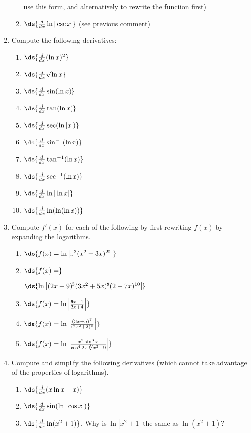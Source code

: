 \begin{multicols}{2}
\begin{enumerate}
\begin{enumerate}
                                         use this form, and alternatively to
                                         rewrite the function first)
   \item $\ds{\frac{d}{dx}\ln|\csc x|}$ (see previous comment)
   \end{enumerate}
\item Compute the following derivatives:
  \begin{enumerate}
  \item $\ds{\frac{d}{dx}(\ln x)^2}$
  \item $\ds{\frac{d}{dx}\sqrt{\ln x}}$
  \item $\ds{\frac{d}{dx}\sin(\ln x)}$
  \item $\ds{\frac{d}{dx}\tan(\ln x)}$
  \item $\ds{\frac{d}{dx}\sec(\ln|x|)}$
  \item $\ds{\frac{d}{dx}\sin^{-1}(\ln x)}$
  \item $\ds{\frac{d}{dx}\tan^{-1}(\ln x)}$
  \item $\ds{\frac{d}{dx}\sec^{-1}(\ln x)}$
  \item $\ds{\frac{d}{dx}\ln|\ln x|}$
  \item $\ds{\frac{d}{dx}\ln(\ln(\ln x))}$
  \end{enumerate}
\item Compute $f'(x)$ for each of the following by first rewriting $f(x)$
       by expanding the logarithms.
  \begin{enumerate}
  \item $\ds{f(x)=\ln\left|x^3(x^2+3x)^{20}\right|}$
  \item $\ds{f(x)=}$

         $\ds{\ln\left|(2x+9)^3(3x^2+5x)^9(2-7x)^{10}
             \right|}$
  \item $\ds{f(x)=\ln\left|\frac{9x-1}{2x+4}\right|}$
  \item $\ds{f(x)=\ln\left|\frac{(3x+5)^7}{(7x^2+2)^5}\right|}$
  \item $\ds{f(x)=\ln\left|\frac{x^2\sin^3x}{\cos^42x\sqrt[3]{x^2-9}}\right|}$
  \end{enumerate}
\item Compute and simplify the following derivatives (which cannot take
      advantage of the properties of logarithms).
    \begin{enumerate}
    \item $\ds{\frac{d}{dx}(x\ln x-x)}$
    \item $\ds{\frac{d}{dx}\sin(\ln|\cos x|)}$
    \item $\ds{\frac{d}{dx}\ln(x^2+1)}$. Why is $\ln|x^2+1|$ the
                                         same as $\ln(x^2+1)$?


\end{enumerate}
\end{enumerate}
\end{multicols}
